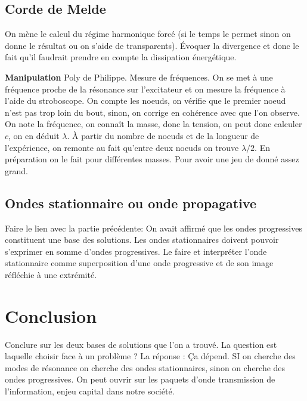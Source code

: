 \documentclass[french, a4paper, 10pt, twocolumn, landscape]{article}
\begin{document}
\subsection*{Corde de Melde}

On mène le calcul du régime harmonique forcé (si le temps le permet sinon on donne le résultat ou on s'aide de transparents). Évoquer la divergence et donc le fait qu'il faudrait prendre en compte la dissipation énergétique.

\textbf{Manipulation} Poly de Philippe. Mesure de fréquences. On se met à une fréquence proche de la résonance sur l'excitateur et on mesure la fréquence à l'aide du stroboscope. On compte les noeuds, on vérifie que le premier noeud n'est pas trop loin du bout, sinon, on corrige en cohérence avec que l'on observe. On note la fréquence, on connaît la masse, donc la tension, on peut donc calculer $c$, on en déduit $\lambda$. À partir du nombre de noeuds et de la longueur de l'expérience, on remonte au fait qu'entre deux noeuds on trouve $\lambda/2$. En préparation on le fait pour différentes masses. Pour avoir une jeu de donné assez grand.

\subsection*{Ondes stationnaire ou onde propagative}

Faire le lien avec la partie précédente: On avait affirmé que les ondes progressives constituent une base des solutions. Les ondes stationnaires doivent pouvoir s'exprimer en somme d'ondes progressives. Le faire et interpréter l'onde stationnaire comme superposition d'une onde progressive et de son image réfléchie à une extrémité.

\section*{Conclusion}

Conclure sur les deux bases de solutions que l'on a trouvé. La question est laquelle choisir face à un problème ? La réponse : Ça dépend. SI on cherche des modes de résonance on cherche des ondes stationnaires, sinon on cherche des ondes progressives. On peut ouvrir sur les paquets d'onde transmission de l'information, enjeu capital dans notre société.
\end{document}
